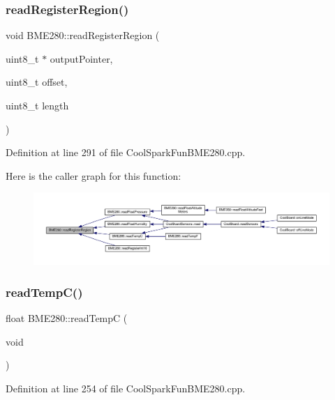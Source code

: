 \subsubsection{\texorpdfstring{read\+Register\+Region()}{readRegisterRegion()}}
{\footnotesize\ttfamily void B\+M\+E280\+::read\+Register\+Region (\begin{DoxyParamCaption}\item[{uint8\+\_\+t $\ast$}]{output\+Pointer,  }\item[{uint8\+\_\+t}]{offset,  }\item[{uint8\+\_\+t}]{length }\end{DoxyParamCaption})}



Definition at line 291 of file Cool\+Spark\+Fun\+B\+M\+E280.\+cpp.

Here is the caller graph for this function\+:
\nopagebreak
\begin{figure}[H]
\begin{center}
\leavevmode
\includegraphics[width=350pt]{class_b_m_e280_aecca87c2c40a7f2bcabcea921bdc6124_icgraph}
\end{center}
\end{figure}
\mbox{\label{class_b_m_e280_afffdd1d7ded9e1f92200e70669019d97}} 
\subsubsection{\texorpdfstring{read\+Temp\+C()}{readTempC()}}
{\footnotesize\ttfamily float B\+M\+E280\+::read\+TempC (\begin{DoxyParamCaption}\item[{void}]{ }\end{DoxyParamCaption})}



Definition at line 254 of file Cool\+Spark\+Fun\+B\+M\+E280.\+cpp.

